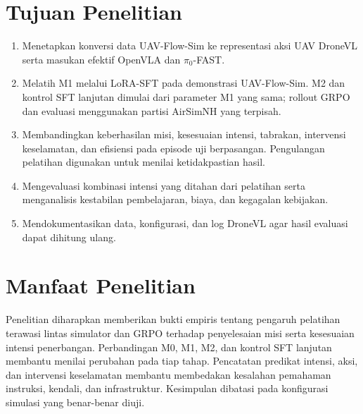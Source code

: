 \section{Tujuan Penelitian}
\label{sec:tujuan_penelitian}
\begin{enumerate}
    \item Menetapkan konversi data UAV-Flow-Sim ke representasi aksi UAV DroneVL serta masukan efektif OpenVLA dan $\pi_0$-FAST.
    \item Melatih M1 melalui LoRA-SFT pada demonstrasi UAV-Flow-Sim. M2 dan kontrol SFT lanjutan dimulai dari parameter M1 yang sama; rollout GRPO dan evaluasi menggunakan partisi AirSimNH yang terpisah.
    \item Membandingkan keberhasilan misi, kesesuaian intensi, tabrakan, intervensi keselamatan, dan efisiensi pada episode uji berpasangan. Pengulangan pelatihan digunakan untuk menilai ketidakpastian hasil.
    \item Mengevaluasi kombinasi intensi yang ditahan dari pelatihan serta menganalisis kestabilan pembelajaran, biaya, dan kegagalan kebijakan.
    \item Mendokumentasikan data, konfigurasi, dan log DroneVL agar hasil evaluasi dapat dihitung ulang.
\end{enumerate}

\section{Manfaat Penelitian}
\label{sec:manfaat_penelitian}
Penelitian diharapkan memberikan bukti empiris tentang pengaruh pelatihan terawasi lintas simulator dan GRPO terhadap penyelesaian misi serta kesesuaian intensi penerbangan. Perbandingan M0, M1, M2, dan kontrol SFT lanjutan membantu menilai perubahan pada tiap tahap. Pencatatan predikat intensi, aksi, dan intervensi keselamatan membantu membedakan kesalahan pemahaman instruksi, kendali, dan infrastruktur. Kesimpulan dibatasi pada konfigurasi simulasi yang benar-benar diuji.

